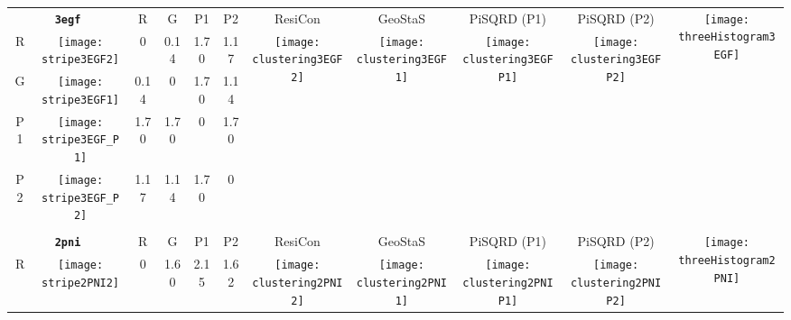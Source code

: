 \documentclass[a4paper,11pt,twoside]{book}%
\begin{document}
\begin{appendices}
\begin{sidewaystable}[h!]
\sffamily
\begin{tabular*}{4cm}{cc|c|c|c|c|c|c|c|c|c|}
\cline{1-11}
\multicolumn{2}{|c|}{{\bf \texttt{3egf}}} & R & G & P1 & P2 & ResiCon & GeoStaS & PiSQRD (P1) & PiSQRD (P2) & \multirow{5}{*}{\vspace{-0.15cm}\texttt{[image: threeHistogram3EGF]}}  \\
\cline{1-10}
\multicolumn{1}{|c|}{R} & \texttt{[image: stripe3EGF2]} & 0 & 0.14 & 1.70 & 1.17 & \multirow{4}{*}{\vspace{-0.3cm}\texttt{[image: clustering3EGF2]}} & \multirow{4}{*}{\vspace{-0.3cm}\texttt{[image: clustering3EGF1]}} & \multirow{4}{*}{\vspace{-0.3cm}\texttt{[image: clustering3EGFP1]}} & \multirow{4}{*}{\vspace{-0.3cm}\texttt{[image: clustering3EGFP2]}} &  \multirow{5}{*}{} \\
\cline{1-6}
\multicolumn{1}{|c|}{G} & \texttt{[image: stripe3EGF1]} & 0.14 & 0 & 1.70 & 1.14 & \multirow{4}{*}{} & \multirow{4}{*}{} & \multirow{4}{*}{} & \multirow{4}{*}{} & \multirow{5}{*}{} \\
\cline{1-6}
\multicolumn{1}{|c|}{P1} & \texttt{[image: stripe3EGF\_P1]} & 1.70 & 1.70 & 0 & 1.70 & \multirow{4}{*}{} & \multirow{4}{*}{} & \multirow{4}{*}{} & \multirow{4}{*}{} & \multirow{5}{*}{}  \\
\cline{1-6}
\multicolumn{1}{|c|}{P2} & \texttt{[image: stripe3EGF\_P2]} & 1.17 & 1.14 & 1.70 & 0 & \multirow{4}{*}{} & \multirow{4}{*}{} & \multirow{4}{*}{} & \multirow{4}{*}{} & \multirow{5}{*}{}  \\
\cline{1-11}
\\
\cline{1-11}
\multicolumn{2}{|c|}{{\bf \texttt{2pni}}} & R & G & P1 & P2 & ResiCon & GeoStaS & PiSQRD (P1) & PiSQRD (P2) & \multirow{5}{*}{\vspace{-0.15cm}\texttt{[image: threeHistogram2PNI]}}  \\
\cline{1-10}
\multicolumn{1}{|c|}{R} & \texttt{[image: stripe2PNI2]} & 0 & 1.60 & 2.15 & 1.62 & \multirow{4}{*}{\vspace{-0.3cm}\texttt{[image: clustering2PNI2]}} & \multirow{4}{*}{\vspace{-0.3cm}\texttt{[image: clustering2PNI1]}} & \multirow{4}{*}{\vspace{-0.3cm}\texttt{[image: clustering2PNIP1]}} & \multirow{4}{*}{\vspace{-0.3cm}\texttt{[image: clustering2PNIP2]}} &  \multirow{5}{*}{} \\

\end{tabular*}
\end{sidewaystable}
\end{appendices}
\end{document}
